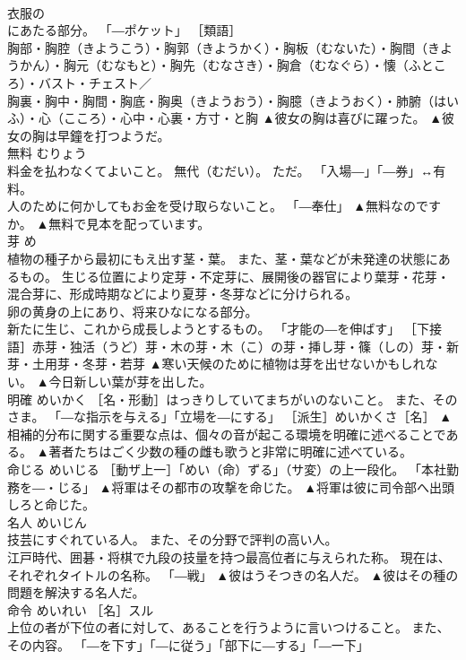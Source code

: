 \documentclass[8pt]{extreport}
\begin{document}
\begin{CJK}{UTF8}{min}
\\	衣服の 
\\	にあたる部分。 「―ポケット」 ［類語］
\\	胸部・胸腔（きようこう）・胸郭（きようかく）・胸板（むないた）・胸間（きようかん）・胸元（むなもと）・胸先（むなさき）・胸倉（むなぐら）・懐（ふところ）・バスト・チェスト／
\\	胸裏・胸中・胸間・胸底・胸奥（きようおう）・胸臆（きようおく）・肺腑（はいふ）・心（こころ）・心中・心裏・方寸・と胸	▲彼女の胸は喜びに躍った。 ▲彼女の胸は早鐘を打つようだ。
\\	無料	むりょう	
\\	料金を払わなくてよいこと。 無代（むだい）。 ただ。 「入場―」「―券」↔有料。 
\\	人のために何かしてもお金を受け取らないこと。 「―奉仕」	▲無料なのですか。 ▲無料で見本を配っています。
\\	芽	め	
\\	植物の種子から最初にもえ出す茎・葉。 また、茎・葉などが未発達の状態にあるもの。 生じる位置により定芽・不定芽に、展開後の器官により葉芽・花芽・混合芽に、形成時期などにより夏芽・冬芽などに分けられる。 
\\	卵の黄身の上にあり、将来ひなになる部分。 
\\	新たに生じ、これから成長しようとするもの。 「才能の―を伸ばす」 ［下接語］赤芽・独活（うど）芽・木の芽・木（こ）の芽・挿し芽・篠（しの）芽・新芽・土用芽・冬芽・若芽	▲寒い天候のために植物は芽を出せないかもしれない。 ▲今日新しい葉が芽を出した。
\\	明確	めいかく	［名・形動］はっきりしていてまちがいのないこと。 また、そのさま。 「―な指示を与える」「立場を―にする」 ［派生］めいかくさ［名］	▲相補的分布に関する重要な点は、個々の音が起こる環境を明確に述べることである。 ▲著者たちはごく少数の種の雌も歌うと非常に明確に述べている。
\\	命じる	めいじる	［動ザ上一］「めい（命）ずる」（サ変）の上一段化。 「本社勤務を―・じる」	▲将軍はその都市の攻撃を命じた。 ▲将軍は彼に司令部へ出頭しろと命じた。
\\	名人	めいじん	
\\	技芸にすぐれている人。 また、その分野で評判の高い人。 
\\	江戸時代、囲碁・将棋で九段の技量を持つ最高位者に与えられた称。 現在は、それぞれタイトルの名称。 「―戦」	▲彼はうそつきの名人だ。 ▲彼はその種の問題を解決する名人だ。
\\	命令	めいれい	［名］スル 
\\	上位の者が下位の者に対して、あることを行うように言いつけること。 また、その内容。 「―を下す」「―に従う」「部下に―する」「―一下」 

\end{CJK}
\end{document}
